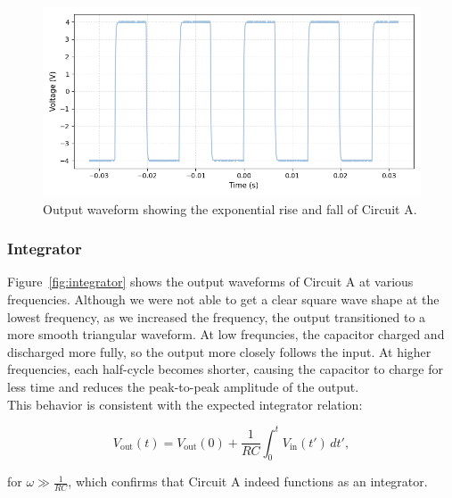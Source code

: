 \documentclass{article}
\begin{document}
\begin{figure}[H]
    \centering
    \includegraphics[width=0.65\linewidth]{2.1.a.png}
    \caption{Output waveform showing the exponential rise and fall of Circuit A.}
    \label{fig:a_rise_fall}
\end{figure}


\subsubsection{Integrator}

Figure~\ref{fig:integrator} shows the output waveforms of Circuit A at various
frequencies. Although we were not able to get a clear square wave shape at the
lowest frequency, as we increased the frequency, the output transitioned to a
more smooth triangular waveform. At low frequncies, the capacitor charged and discharged
more fully, so the output more closely follows the input. At higher frequencies, each
half-cycle becomes shorter, causing the capacitor to charge for less time and reduces
the peak-to-peak amplitude of the output.\\ 

\noindent This behavior is consistent with the expected integrator relation:

\begin{equation}
    V_\text{out}(t) = V_\text{out}(0)+\frac{1}{RC}\int_0^tV_\text{in}(t')\,dt',
\end{equation}

\noindent for $\omega\gg\frac{1}{RC}$, which confirms that Circuit A indeed 
functions as an integrator.
\end{document}
